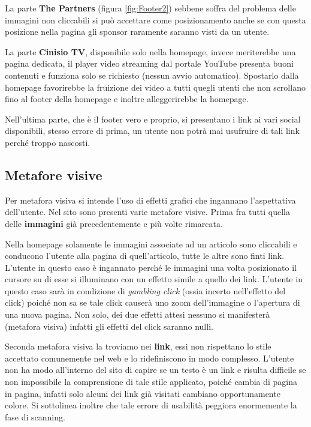 		
		 La parte \textbf{The Partners} (figura \ref{fig:Footer2}) sebbene soffra del problema delle immagini non cliccabili si può accettare come posizionamento anche se con questa posizione nella pagina gli sponsor raramente saranno visti da un utente.	  		

		
		La parte \textbf{Cinisio TV}, disponibile solo nella homepage, invece meriterebbe una pagina dedicata, il player video streaming dal portale YouTube presenta buoni contenuti e funziona solo se richiesto (nessun avvio automatico). Spostarlo dalla homepage favorirebbe la fruizione dei video a tutti quegli utenti che non scrollano fino al footer della homepage e inoltre alleggerirebbe la homepage.
		
		Nell'ultima parte, che è il footer vero e proprio, si presentano i link ai vari social disponibili, stesso errore di prima, un utente non potrà mai usufruire di tali link perché troppo nascosti.
		
		\newpage
		\subsection{Metafore visive}
			Per metafora visiva si intende l'uso di effetti grafici che ingannano l'aspettativa dell'utente. Nel sito sono presenti varie metafore visive. Prima fra tutti quella delle \textbf{immagini} già precedentemente e più volte rimarcata. 
			
			Nella homepage solamente le immagini associate ad un articolo sono cliccabili e conducono l'utente alla pagina di quell'articolo, tutte le altre sono finti link. L'utente in questo caso è ingannato perché le immagini una volta posizionato il cursore su di esse si illuminano con un effetto simile a quello dei link. L'utente in questo caso sarà in condizione di \textit{gambling click} (ossia incerto nell'effetto del click) poiché non sa se tale click causerà uno zoom dell'immagine o l'apertura di una nuova pagina. Non solo, dei due effetti attesi nessuno si manifesterà (metafora visiva) infatti gli effetti del click saranno nulli.
			
			Seconda metafora visiva la troviamo nei \textbf{link}, essi non rispettano lo stile accettato comunemente nel web e lo ridefiniscono in modo complesso. L'utente non ha modo all'interno del sito di capire se un testo è un link e risulta difficile se non impossibile la comprensione di tale stile applicato, poiché cambia di pagina in pagina, infatti solo alcuni dei link già visitati cambiano opportunamente colore. Si sottolinea inoltre che tale errore di usabilità peggiora enormemente la fase di scanning.
			
